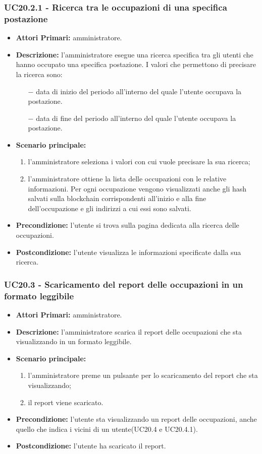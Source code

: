 \subsubsection{ UC20.2.1 - Ricerca tra le occupazioni di una specifica postazione}
\begin{itemize}
	\item\textbf{Attori Primari:} 
	amministratore.
	\item\textbf{Descrizione:} 
	l'amministratore esegue una ricerca specifica tra gli utenti che hanno occupato una specifica postazione.
	I valori che permettono di precisare la ricerca sono:
	\begin{itemize}
		\item[$-$] data di inizio del periodo all'interno del quale l'utente occupava la postazione.
		\item[$-$] data di fine del periodo all'interno del quale l'utente occupava la postazione.
	\end{itemize}
	\item\textbf{Scenario principale:} 
	\begin{enumerate}
		\item l'amministratore seleziona i valori con cui vuole precisare la sua ricerca;
		\item l'amministratore ottiene la lista delle occupazioni con le relative informazioni. Per ogni occupazione vengono visualizzati anche gli hash salvati sulla blockchain corrispondenti all'inizio e alla fine dell'occupazione e gli indirizzi a cui essi sono salvati.
	\end{enumerate}
	\item\textbf{Precondizione:} 
	l'utente si trova sulla pagina dedicata alla ricerca delle occupazioni.
	\item\textbf{Postcondizione:}
	l'utente visualizza le informazioni specificate dalla sua ricerca.
\end{itemize}

\subsubsection{ UC20.3 - Scaricamento del report delle occupazioni in un formato leggibile}
\begin{itemize}
	\item\textbf{Attori Primari:} 
	amministratore.
	\item\textbf{Descrizione:} 
	l'amministratore scarica il report delle occupazioni che sta visualizzando in un formato leggibile.
	\item\textbf{Scenario principale:} 
	\begin{enumerate}
		\item l'amministratore preme un pulsante per lo scaricamento del report che sta visualizzando;
		\item il report viene scaricato.
	\end{enumerate}
	\item\textbf{Precondizione:} 
	l'utente sta visualizzando un report delle occupazioni, anche quello che indica i vicini di un utente(UC20.4 e UC20.4.1).
	\item\textbf{Postcondizione:}
	l'utente ha scaricato il report.
\end{itemize}

